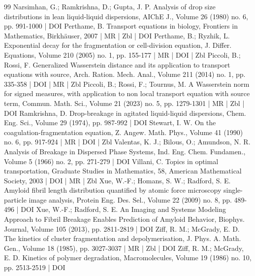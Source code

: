\begin{thebibliography}{99}
Narsimhan, G.; Ramkrishna, D.; Gupta, J. P. Analysis of drop size distributions in lean liquid-liquid dispersions, AIChE J., Volume 26 (1980) no. 6, pp. 991-1000 | DOI
Perthame, B. Transport equations in biology, Frontiers in Mathematics, Birkhäuser, 2007 | MR | Zbl | DOI
Perthame, B.; Ryzhik, L. Exponential decay for the fragmentation or cell-division equation, J. Differ. Equations, Volume 210 (2005) no. 1, pp. 155-177 | MR | DOI | Zbl
Piccoli, B.; Rossi, F. Generalized Wasserstein distance and its application to transport equations with source, Arch. Ration. Mech. Anal., Volume 211 (2014) no. 1, pp. 335-358 | DOI | MR | Zbl
Piccoli, B.; Rossi, F.; Tournus, M. A Wasserstein norm for signed measures, with application to non local transport equation with source term, Commun. Math. Sci., Volume 21 (2023) no. 5, pp. 1279-1301 | MR | Zbl | DOI
Ramkrishna, D. Drop-breakage in agitated liquid-liquid dispersions, Chem. Eng. Sci., Volume 29 (1974), pp. 987-992 | DOI
Stewart, I. W. On the coagulation-fragmentation equation, Z. Angew. Math. Phys., Volume 41 (1990) no. 6, pp. 917-924 | MR | DOI | Zbl
Valentas, K. J.; Bilous, O.; Amundson, N. R. Analysis of Breakage in Dispersed Phase Systems, Ind. Eng. Chem. Fundamen., Volume 5 (1966) no. 2, pp. 271-279 | DOI
Villani, C. Topics in optimal transportation, Graduate Studies in Mathematics, 58, American Mathematical Society, 2003 | DOI | MR | Zbl
Xue, W.-F.; Homans, S. W.; Radford, S. E. Amyloid fibril length distribution quantified by atomic force microscopy single-particle image analysis, Protein Eng. Des. Sel., Volume 22 (2009) no. 8, pp. 489-496 | DOI
Xue, W.-F.; Radford, S. E. An Imaging and Systems Modeling Approach to Fibril Breakage Enables Prediction of Amyloid Behavior, Biophys. Journal, Volume 105 (2013), pp. 2811-2819 | DOI
Ziff, R. M.; McGrady, E. D. The kinetics of cluster fragmentation and depolymerisation, J. Phys. A. Math. Gen., Volume 18 (1985), pp. 3027-3037 | MR | Zbl | DOI
Ziff, R. M.; McGrady, E. D. Kinetics of polymer degradation, Macromolecules, Volume 19 (1986) no. 10, pp. 2513-2519 | DOI
\end{thebibliography}
